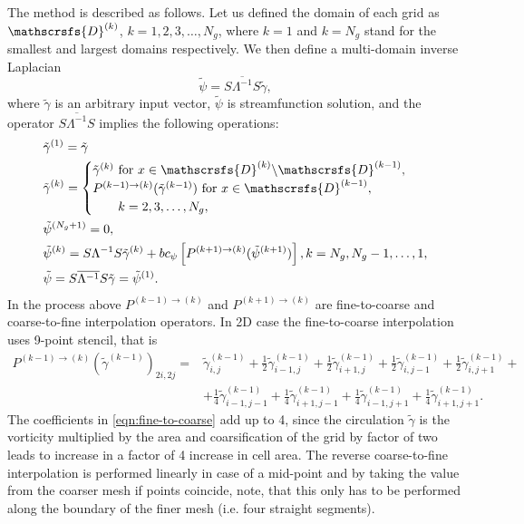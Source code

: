 \documentclass{article}
\numberwithin{equation}{section}
\begin{document}
The method is described as follows. Let us defined the domain of each grid as $\mathscrsfs{D}^{(k)}$, $k=1,2,3,\dots,N_g$, where $k=1$ and $k=N_g$ stand for the smallest and largest domains respectively. We then define a multi-domain inverse Laplacian
\begin{equation}
	\tilde\psi=S\overline{\Lambda^{-1}}S\tilde\gamma,
\end{equation}
where $\tilde\gamma$ is an arbitrary input vector, $\tilde\psi$ is streamfunction solution, and the operator $S\overline{\Lambda^{-1}}S$ implies the following operations:
\begin{align}
	&\tilde\gamma^{(1)}=\tilde\gamma\\
	&\tilde\gamma^{(k)}=
		\begin{cases}
			\tilde\gamma^{(k)} \text{ for } x\in \mathscrsfs{D}^{(k)}\backslash\mathscrsfs{D}^{(k-1)},\\
			P^{(k-1)\to(k)}(\tilde\gamma^{(k-1)}) \text{ for } x\in\mathscrsfs{D}^{(k-1)},\\
			\qquad k=2,3,\dots,N_g,
		\end{cases}\\
	&\tilde\psi^{(N_g+1)}=0,\\
	&\tilde\psi^{(k)}=S\Lambda^{-1}S\tilde\gamma^{(k)} + bc_\psi\left[P^{(k+1)\to(k)}(\tilde\psi^{(k+1)}) \right], k=N_g,N_g-1,\dots,1,\\
	&\tilde\psi = S\overline{\Lambda^{-1}}S\tilde\gamma=\tilde\psi^{(1)}.
\end{align}
In the process above $P^{(k-1)\to(k)}$ and $P^{(k+1)\to(k)}$ are fine-to-coarse and coarse-to-fine interpolation operators. In 2D case the fine-to-coarse interpolation uses 9-point stencil, that is
\begin{equation}\label{eqn:fine-to-coarse}
\begin{aligned}
	P^{(k-1) \rightarrow(k)}\left(\tilde{\gamma}^{(k-1)}\right)_{2 i, 2 j}= 
	& \tilde{\gamma}_{i, j}^{(k-1)}+\frac{1}{2} \tilde{\gamma}_{i-1, j}^{(k-1)}+\frac{1}{2} \tilde{\gamma}_{i+1, j}^{(k-1)} +\frac{1}{2} \tilde{\gamma}_{i, j-1}^{(k-1)}+\frac{1}{2} \tilde{\gamma}_{i, j+1}^{(k-1)}+\\
	&+\frac{1}{4} \tilde{\gamma}_{i-1, j-1}^{(k-1)} +\frac{1}{4} \tilde{\gamma}_{i+1, j-1}^{(k-1)}+\frac{1}{4} \tilde{\gamma}_{i-1, j+1}^{(k-1)}  +\frac{1}{4} \tilde{\gamma}_{i+1, j+1}^{(k-1)}.
\end{aligned}
\end{equation}
The coefficients in \cref{eqn:fine-to-coarse} add up to 4, since the circulation $\tilde\gamma$  is the vorticity multiplied by the area and coarsification of the grid by factor of two leads to increase in a factor of 4 increase in cell area. The reverse coarse-to-fine interpolation is performed linearly in case of a mid-point and by taking the value from the coarser mesh if points coincide, note, that this only has to be performed along the boundary of the finer mesh (i.e. four straight segments). 
\end{document}
